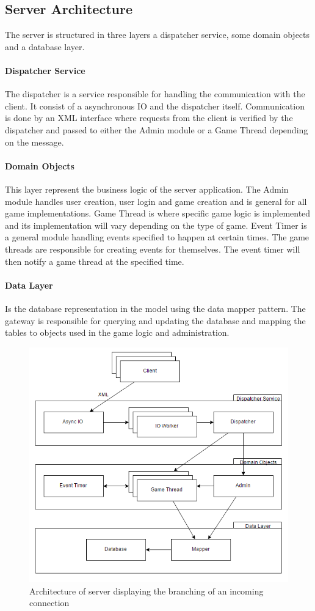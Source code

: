 \subsection{Server Architecture}\label{sec:server}
The server is structured in three layers a dispatcher service, some domain objects and a database layer. 

\paragraph{Dispatcher Service}
The dispatcher is a service responsible for handling the communication with the client. It consist of a asynchronous IO and the dispatcher itself. Communication is done by an XML interface where requests from the client is verified by the dispatcher and passed to either the Admin module or a Game Thread depending on the message. 

\paragraph{Domain Objects}
This layer represent the business logic of the server application. The Admin module handles user creation, user login and game creation and is general for all game implementations. Game Thread is where specific game logic is implemented and its implementation will vary depending on the type of game. Event Timer is a general module handling events specified to happen at certain times. The game threads are responsible for creating events for themselves. The event timer will then notify a game thread at the specified time.

\paragraph{Data Layer}
Is the database representation in the model using the data mapper pattern. The gateway is responsible for querying and updating the database and mapping the tables to objects used in the game logic and administration.

\begin{figure}[H]
  \centering
  \includegraphics[width=\textwidth]{billeder/serverarch.png}  
  \caption{Architecture of server displaying the branching of an incoming connection}
  \label{fig:serverarch}
\end{figure}